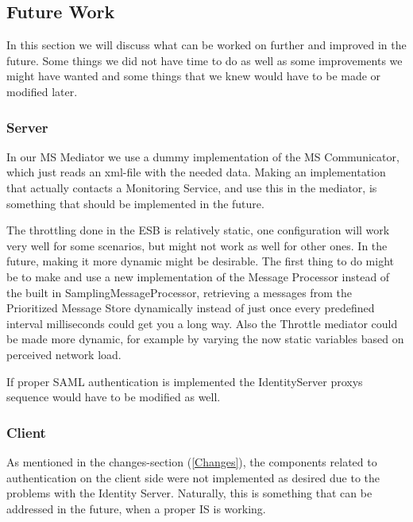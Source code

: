 \subsection{Future Work}\label{Future Work}
    In this section we will discuss what can be worked on further and improved in the future. Some things we did not have time to do as well as some improvements we might have wanted and some things that we knew would have to be made or modified later.

    \subsubsection{Server}\label{Future:Server}
        In our MS Mediator we use a dummy implementation of the MS Communicator, which just reads an xml-file with the needed data. Making an implementation that actually contacts a Monitoring Service, and use this in the mediator, is something that should be implemented in the future.

        The throttling done in the ESB is relatively static, one configuration will work very well for some scenarios, but might not work as well for other ones. In the future, making it more dynamic might be desirable. The first thing to do might be to make and use a new implementation of the Message Processor instead of the built in SamplingMessageProcessor, retrieving a messages from the Prioritized Message Store dynamically instead of just once every predefined interval milliseconds could get you a long way. Also the Throttle mediator could be made more dynamic, for example by varying the now static variables based on perceived network load.

        If proper SAML authentication is implemented the IdentityServer proxys sequence would have to be modified as well.

	\subsubsection{Client}\label{Future:Client}
		As mentioned in the changes-section (\ref{Changes}), the components related to authentication on the client side were not implemented as desired due to the problems with the Identity Server. Naturally, this is something that can be addressed in the future, when a proper IS is working.

